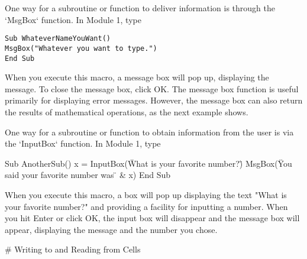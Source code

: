 One way for a subroutine or function to deliver information is through
the `MsgBox` function. In Module 1, type

\small\begin{verbatim}
Sub WhateverNameYouWant()
MsgBox("Whatever you want to type.")
End Sub
\end{verbatim}\normalsize

When you execute this macro, a message box will pop up, displaying the message.  To close the message box, click OK.  
The message box function is useful primarily for displaying error messages.    However, the message box can also return the results of mathematical operations, as the next example shows.
\vfil\eject

One way for a subroutine or function to obtain information from the user
is via the `InputBox` function. In Module 1, type

Sub AnotherSub() 
x = InputBox(\"What is your favorite number?\")
MsgBox(\"You said your favorite number was \" & x)
End Sub

When you execute this macro, a box will pop up displaying the text "What
is your favorite number?" and providing a facility for inputting a
number. When you hit Enter or click OK, the input box will disappear and
the message box will appear, displaying the message and the number you
chose.

# Writing to and Reading from Cells


